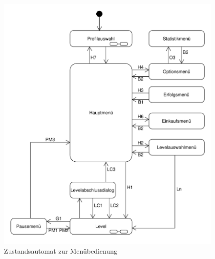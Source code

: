 \begin{figure}[H]
\centering
\includegraphics[scale=0.65]{../system_models/dynamic_models/menu_state_machine.pdf}
\caption{Zustandsautomat zur Menübedienung}
\end{figure}

